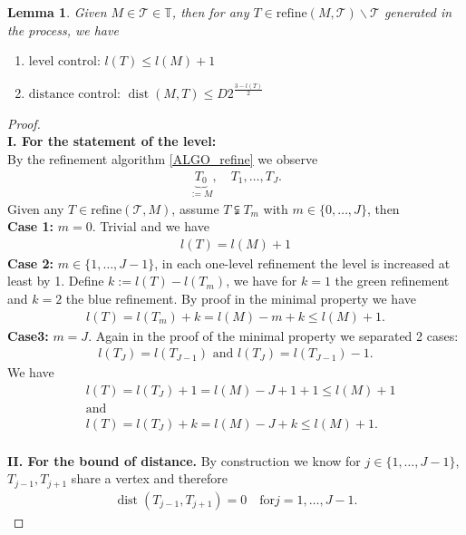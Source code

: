 \documentclass[a4paper,12pt,oneside,fleqn]{book}
\newtheorem{lemma}[theorem]{Lemma}
\theoremstyle{definition}
\theoremstyle{remark}
\DeclareMathOperator*{\dist}{dist}
\begin{document}
\begin{lemma}
	Given $M \in \mathcal{T} \in \mathbb{T}$, then for any $T \in \text{refine}(M, \mathcal{T}) \backslash \mathcal{T} $ generated in the process, we have
	\begin{enumerate}
		\item $\text{level control: }l(T) \le l(M) + 1$
		\item $\text{distance control: }\dist(M, T) \le D 2^{\frac{3 - l(T)}{2}}$
	\end{enumerate}
\end{lemma}
\begin{proof}
\quad\\
\textbf{I. For the statement of the level:}\\
By the refinement algorithm \eqref{ALGO_refine} we observe
\begin{align*}
	 \underbrace{T_0}_{:= M},\quad T_1, \dots, T_J. 
\end{align*}
Given any $T \in \text{refine}(\mathcal{T}, M)$, assume $T  \subsetneqq T_m$ with $m \in \{0, \dots, J\} $, then\\
\textbf{Case 1:} $m = 0$. 
Trivial and we have 
\begin{align*}
	l(T) = l(M) + 1
\end{align*}
\textbf{Case 2:} $m \in \{1, \dots, J -1\}$, in each one-level refinement the level is increased at least by 1. Define $k:= l(T) - l(T_m)$, we have for $k = 1$ the green refinement and $k = 2$ the blue refinement. By proof in the minimal property we have
\begin{align*}
	l(T) = l(T_m) + k  =  l(M) - m + k \le l(M) + 1 . 
\end{align*}
\textbf{Case3:} $m = J$. Again in the proof of the minimal property we separated 2 cases:
\begin{align*}
	l(T_J) = l(T_{J -1}) \text{ and } l(T_J) = l(T_{J -1}) -1. 
\end{align*}
We have
\begin{align*}
	& l(T) = l(T_J) + 1 = l(M)-J+1+1 \le l(M) + 1\\
	& \text{and}\\
	& l(T) = l(T_J) + k = l(M) - J + k\le l(M) + 1. 
\end{align*}
\quad\\
\textbf{II. For the bound of distance.}
By construction we know for $j \in \{1, \dots, J -1\}$, 
$T_{j -1}, T_{j +1}$ share a vertex and therefore
\begin{align*}
	\dist(T_{j -1}, T_{j+1}) = 0 \quad \text{for} j = 1, \dots, J -1.

\end{align*}
\end{proof}
\end{document}
